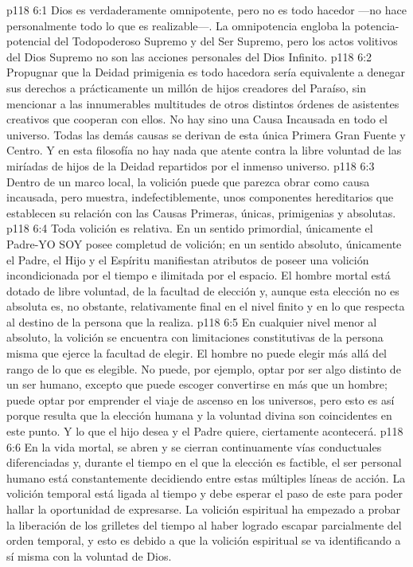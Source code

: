 \vs p118 6:1 Dios es verdaderamente omnipotente, pero no es todo hacedor ---no hace personalmente todo lo que es realizable---. La omnipotencia engloba la potencia\hyp{}potencial del Todopoderoso Supremo y del Ser Supremo, pero los actos volitivos del Dios Supremo no son las acciones personales del Dios Infinito.
\vs p118 6:2 Propugnar que la Deidad primigenia es todo hacedora sería equivalente a denegar sus derechos a prácticamente un millón de hijos creadores del Paraíso, sin mencionar a las innumerables multitudes de otros distintos órdenes de asistentes creativos que cooperan con ellos. No hay sino una Causa Incausada en todo el universo. Todas las demás causas se derivan de esta única Primera Gran Fuente y Centro. Y en esta filosofía no hay nada que atente contra la libre voluntad de las miríadas de hijos de la Deidad repartidos por el inmenso universo.
\vs p118 6:3 \pc Dentro de un marco local, la volición puede que parezca obrar como causa incausada, pero muestra, indefectiblemente, unos componentes hereditarios que establecen su relación con las Causas Primeras, únicas, primigenias y absolutas.
\vs p118 6:4 Toda volición es relativa. En un sentido primordial, únicamente el Padre\hyp{}YO SOY posee completud de volición; en un sentido absoluto, únicamente el Padre, el Hijo y el Espíritu manifiestan atributos de poseer una volición incondicionada por el tiempo e ilimitada por el espacio. El hombre mortal está dotado de libre voluntad, de la facultad de elección y, aunque esta elección no es absoluta es, no obstante, relativamente final en el nivel finito y en lo que respecta al destino de la persona que la realiza.
\vs p118 6:5 En cualquier nivel menor al absoluto, la volición se encuentra con limitaciones constitutivas de la persona misma que ejerce la facultad de elegir. El hombre no puede elegir más allá del rango de lo que es elegible. No puede, por ejemplo, optar por ser algo distinto de un ser humano, excepto que puede escoger convertirse en más que un hombre; puede optar por emprender el viaje de ascenso en los universos, pero esto es así porque resulta que la elección humana y la voluntad divina son coincidentes en este punto. Y lo que el hijo desea y el Padre quiere, ciertamente acontecerá.
\vs p118 6:6 En la vida mortal, se abren y se cierran continuamente vías conductuales diferenciadas y, durante el tiempo en el que la elección es factible, el ser personal humano está constantemente decidiendo entre estas múltiples líneas de acción. La volición temporal está ligada al tiempo y debe esperar el paso de este para poder hallar la oportunidad de expresarse. La volición espiritual ha empezado a probar la liberación de los grilletes del tiempo al haber logrado escapar parcialmente del orden temporal, y esto es debido a que la volición espiritual se va identificando a sí misma con la voluntad de Dios.
